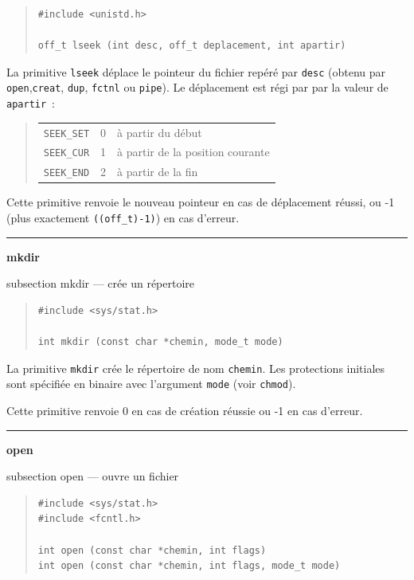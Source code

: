 \documentclass [twoside] {report}
\newcommand {\primitive} [1]
    {
	\phantomsection
	{\large \textbf {#1}}
	\addcontentsline {toc} {subsection} {#1}
    }
\newcommand {\separation}
    {
	\vspace {5mm}
	\nopagebreak
	\hrule
    }
\begin{document}
\begin {quote}
\begin {verbatim}
#include <unistd.h>

off_t lseek (int desc, off_t deplacement, int apartir)
\end{verbatim}
\end {quote}

La primitive \texttt {lseek} déplace le pointeur du
fichier repéré par \texttt {desc} (obtenu par
\texttt {open},\texttt {creat}, \texttt {dup}, \texttt {fctnl} ou \texttt {pipe}).
Le déplacement est régi par par la valeur de
\texttt {apartir}~:

\begin {quote}
    \begin {tabular} {|lll|} \hline
	\texttt {SEEK\_SET} & 0 & à partir du début \\
	\texttt {SEEK\_CUR} & 1 & à partir de la position courante \\
	\texttt {SEEK\_END} & 2 & à partir de la fin \\ \hline
    \end {tabular}
\end {quote}

Cette primitive renvoie le nouveau pointeur en cas
de déplacement réussi, ou -1 (plus exactement \verb|((off_t)-1)|)
en cas d'erreur.




\separation
\primitive {mkdir} --- crée un répertoire

\begin {quote}
\begin {verbatim}
#include <sys/stat.h>

int mkdir (const char *chemin, mode_t mode)
\end{verbatim}
\end {quote}

La primitive \texttt {mkdir} crée le répertoire de nom \texttt {chemin}. Les 
protections initiales sont spécifiée en binaire avec l'argument
\texttt {mode} (voir \texttt {chmod}).

Cette primitive renvoie 0 en cas de création réussie
ou -1 en cas d'erreur.




\separation
\primitive {open} --- ouvre un fichier

\begin {quote}
\begin {verbatim}
#include <sys/stat.h>
#include <fcntl.h>

int open (const char *chemin, int flags)
int open (const char *chemin, int flags, mode_t mode)
\end{verbatim}
\end {quote}
\end{document}
